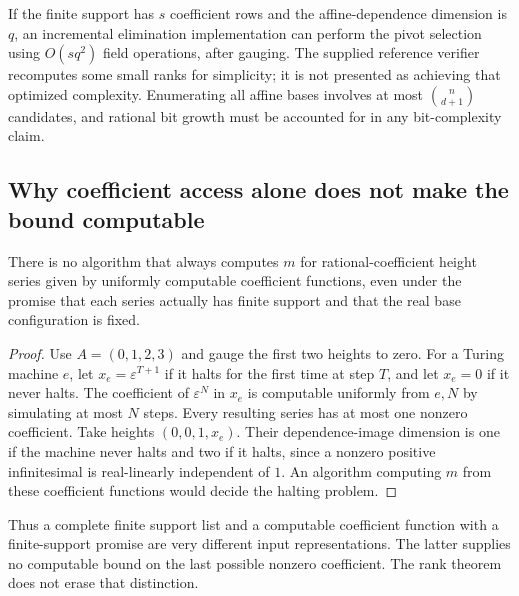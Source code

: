 \documentclass[11pt,a4paper]{article}
\numberwithin{equation}{section}
\theoremstyle{plain}
\newcommand{\eps}{\varepsilon}
\begin{document}
If the finite support has $s$ coefficient rows and the affine-dependence
dimension is $q$, an incremental elimination implementation can perform
the pivot selection using $O(sq^2)$ field operations, after gauging.
The supplied reference verifier recomputes some small ranks for simplicity;
it is not presented as achieving that optimized complexity. Enumerating
all affine bases involves at most $\binom{n}{d+1}$ candidates, and rational
bit growth must be accounted for in any bit-complexity claim.

\subsection{Why coefficient access alone does not make the bound computable}

\begin{proposition}
\label{poly:prop:undecidable}
There is no algorithm that always computes $m$ for rational-coefficient
height series given by uniformly computable coefficient functions, even
under the promise that each series actually has finite support and that
the real base configuration is fixed.
\end{proposition}
\begin{proof}
Use $A=(0,1,2,3)$ and gauge the first two heights to zero. For a Turing
machine $e$, let $x_e=\eps^{T+1}$ if it halts for the first time at step
$T$, and let $x_e=0$ if it never halts. The coefficient of $\eps^N$ in
$x_e$ is computable uniformly from $e,N$ by simulating at most $N$ steps.
Every resulting series has at most one nonzero coefficient. Take heights
$(0,0,1,x_e)$. Their dependence-image dimension is one if the machine
never halts and two if it halts, since a nonzero positive infinitesimal is
real-linearly independent of $1$. An algorithm computing $m$ from these
coefficient functions would decide the halting problem.
\end{proof}

Thus a complete finite support list and a computable coefficient function
with a finite-support promise are very different input representations.
The latter supplies no computable bound on the last possible nonzero
coefficient. The rank theorem does not erase that distinction.
\end{document}
